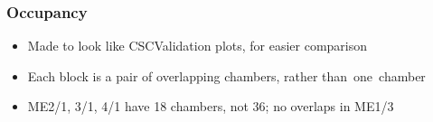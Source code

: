 \documentclass[compress]{beamer}
\begin{document}
\begin{frame}
\frametitle{Occupancy}
\begin{itemize}
\item Made to look like CSCValidation plots, for easier comparison
\item Each block is a pair of overlapping chambers, rather \mbox{than one chamber\hspace{-1 cm}}
\item ME2/1, 3/1, 4/1 have 18 chambers, not 36; no overlaps in ME1/3
\end{itemize}


\end{frame}
\end{document}

